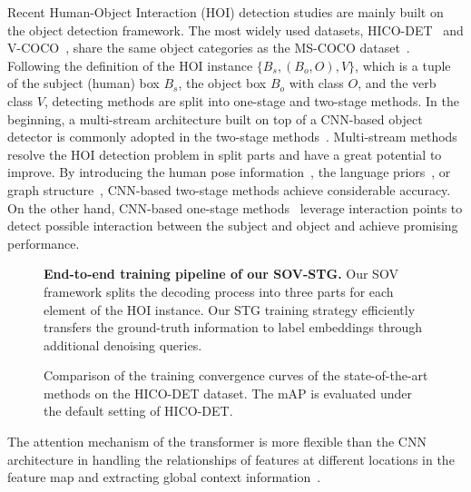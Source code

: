 \documentclass[10pt,twocolumn,letterpaper]{article}
\begin{document}
Recent Human-Object Interaction (HOI) detection studies are mainly built on the object detection framework.
The most widely used datasets, HICO-DET~\cite{chao2018learning} and V-COCO~\cite{gupta2015visual}, share the same object categories as the MS-COCO dataset~\cite{lin2014microsoft}.
Following the definition of the HOI instance $\{ B_s, (B_o, O), V \}$, which is a tuple of the subject (human) box $B_s$, the object box $B_o$ with class $O$, and the verb class $V$, detecting methods are split into one-stage and two-stage methods. 
In the beginning, a multi-stream architecture built on top of a CNN-based object detector is commonly adopted in the two-stage methods~\cite{chao2018learning,gkioxari2018detecting,qi2018learning,gao2018ican}.
Multi-stream methods resolve the HOI detection problem in split parts and have a great potential to improve.
By introducing the human pose information~\cite{kim2020detecting,li2020detailed,zhong2021polysemy}, the language priors~\cite{gao2020drg,zhong2021polysemy}, or graph structure~\cite{gao2020drg,ulutan2020vsgnet,zhang2020spatio}, CNN-based two-stage methods achieve considerable accuracy.
On the other hand, CNN-based one-stage methods~\cite{liao2020ppdm,zhong2021glance,wang2020learning} leverage interaction points to detect possible interaction between the subject and object and achieve promising performance.
\begin{figure}[!t]
    \centering
    \caption{
        \textbf{End-to-end training pipeline of our SOV-STG.} Our SOV framework splits the decoding process into three parts for each element of the HOI instance.
        Our STG training strategy efficiently transfers the ground-truth information to label embeddings through additional denoising queries.
    }
    \label{fig:SOV_STG_pipeline}
\end{figure}
\begin{figure}[!t]
    \centering
    \caption{
        Comparison of the training convergence curves of the state-of-the-art methods on the HICO-DET dataset.
        The mAP is evaluated under the default setting of HICO-DET.
    }
    \label{fig:ap_compare_sota}
\end{figure}
The attention mechanism of the transformer is more flexible than the CNN architecture in handling the relationships of features at different locations in the feature map and extracting global context information~\cite{dosovitskiy2021an}.
\end{document}
